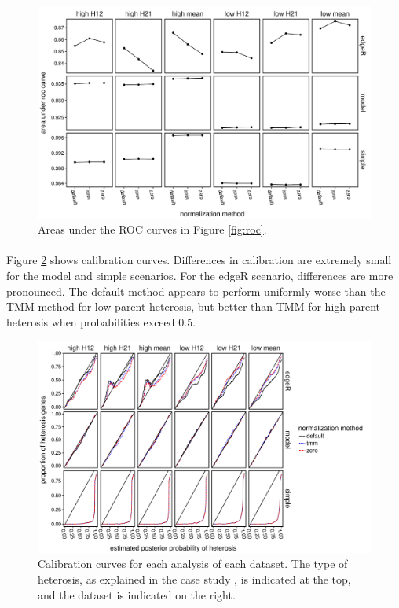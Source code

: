 \documentclass{article}
\begin{document}
\begin{flushleft}
\begin{figure}[htbp]
   \centering
   \includegraphics[scale=0.5]{auc}
   \caption{Areas under the ROC curves in Figure \ref{fig:roc}.}
   \label{fig:auc}
\end{figure}

\paragraph{} Figure \ref{fig:calibration} shows calibration curves. Differences in calibration are extremely small for the model and simple scenarios. For the edgeR scenario, differences are more pronounced. The default method appears to perform uniformly worse than the TMM method for low-parent heterosis, but better than TMM for high-parent heterosis when probabilities exceed 0.5. 

\begin{figure}[htbp]
   \centering
   \includegraphics[scale=0.5]{calibration}
   \caption{Calibration curves for each analysis of each dataset. The type of heterosis, as explained in the case study \cite{thesispaper2}, is indicated at the top, and the dataset is indicated on the right.}
   \label{fig:calibration}
\end{figure}


\end{flushleft}
\end{document}
